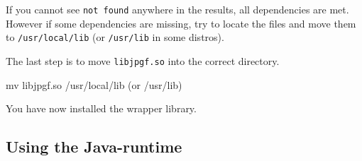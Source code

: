 If you cannot see \texttt{not found} anywhere in the results, all dependencies are met. However if some dependencies are missing, try to locate the files and move them to \texttt{/usr/local/lib} (or \texttt{/usr/lib} in some distros).

The last step is to move \texttt{libjpgf.so} into the correct directory.

\begin{terminal}
mv libjpgf.so /usr/local/lib (or /usr/lib)
\end{terminal}

You have now installed the wrapper library.

\subsection{Using the Java-runtime}
